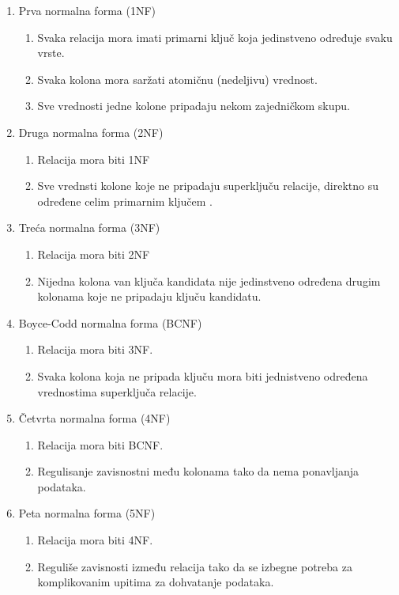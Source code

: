 \documentclass[12pt,oneside]{memoir}
\begin{document}
\begin{enumerate}
\item Prva normalna forma (1NF)
	\begin{enumerate}
	\item[\textbullet] Svaka relacija mora imati primarni ključ koja jedinstveno određuje svaku vrste.
	\item[\textbullet] Svaka kolona mora saržati atomičnu (nedeljivu) vrednost.
	\item[\textbullet] Sve vrednosti jedne kolone pripadaju nekom zajedničkom skupu.
	\end{enumerate}

\item Druga normalna forma (2NF)
	\begin{enumerate}
	\item[\textbullet] Relacija mora biti 1NF
	\item[\textbullet] Sve vrednsti kolone koje ne pripadaju superključu relacije, direktno su određene celim primarnim ključem .
	\end{enumerate}

\item Treća normalna forma (3NF)
	\begin{enumerate}
	\item[\textbullet] Relacija mora biti 2NF
	\item[\textbullet] Nijedna kolona van ključa kandidata nije jedinstveno određena drugim kolonama koje ne pripadaju  ključu kandidatu.
	\end{enumerate}

\item Boyce-Codd normalna forma (BCNF)
	\begin{enumerate}
	\item[\textbullet] Relacija mora biti 3NF.
	\item[\textbullet] Svaka kolona koja ne pripada ključu mora biti jednistveno određena vrednostima superključa relacije.
	\end{enumerate}

\item Četvrta normalna forma (4NF)
	\begin{enumerate}
	\item[\textbullet] Relacija mora biti BCNF.
	\item[\textbullet] Regulisanje zavisnostni među kolonama tako da nema ponavljanja podataka.
	\end{enumerate}

\item Peta normalna forma (5NF)
	\begin{enumerate}
	\item[\textbullet] Relacija mora biti 4NF.
	\item[\textbullet] Reguliše zavisnosti između relacija tako da se izbegne potreba za komplikovanim upitima za dohvatanje podataka.
	\end{enumerate}

\end{enumerate}
\end{document}
